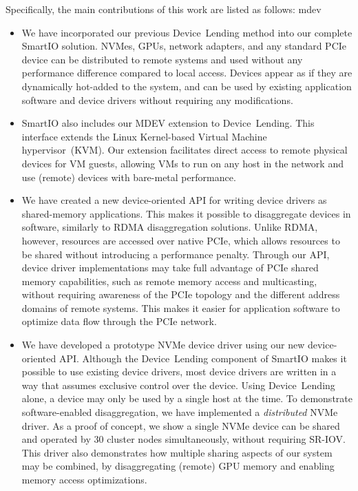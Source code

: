 %
Specifically, the main contributions of this work are listed as follows:
\gls{mdev}
\begin{itemize}

	\item We have incorporated our previous Device~Lending method into our complete SmartIO solution.
		NVMes, GPUs, network adapters, and any standard PCIe device can be distributed to remote systems
		and used without any performance difference compared to local access.
		Devices appear as if they are dynamically hot-added to the system, and can be used by 
		existing application software and device drivers without requiring any modifications.

	\item SmartIO also includes our MDEV extension to Device~Lending. This interface extends the Linux
		Kernel-based Virtual Machine hypervisor~(KVM).
		Our extension facilitates direct access to remote physical devices for VM guests, allowing VMs
		to run on any host in the network and use (remote) devices with bare-metal performance.
		
	\item We have created a new device-oriented API for writing device drivers as shared-memory applications.
		This makes it possible to disaggregate devices in software, similarly to RDMA disaggregation solutions.
		Unlike RDMA, however, resources are accessed over native PCIe, which allows
		resources to be shared without introducing a performance penalty.
		Through our API, device driver implementations may take full advantage of PCIe
		shared memory capabilities, such as remote memory access and multicasting, without requiring
		awareness of the PCIe topology and the different address domains of remote systems.
		This makes it easier for application software to optimize data flow through the PCIe network.

	\item We have developed a prototype NVMe device driver using our new device-oriented API. Although the Device~Lending
		component of SmartIO makes it possible to use existing device drivers, most device drivers
		are written in a way that assumes exclusive control over the device. Using Device~Lending
		alone, a device may only be used by a single host at the time.
		To demonstrate software-enabled disaggregation, we have implemented a \emph{distributed} NVMe
		driver.
		As a proof of concept, we show a single NVMe device can be shared and operated by $30$
		cluster nodes simultaneously, without requiring SR-IOV.
		This driver also demonstrates how multiple sharing aspects of our system may be combined, 
		by disaggregating (remote) GPU memory and enabling memory access optimizations.


\end{itemize}
